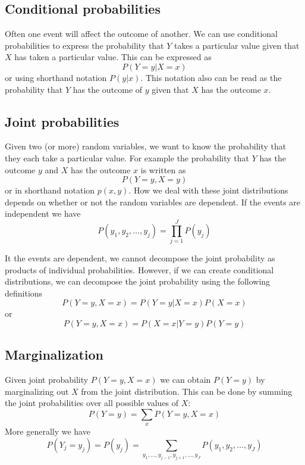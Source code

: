 \documentclass[a4paper,11pt]{article} %
\begin{document}
\subsection{Conditional probabilities}

Often one event will affect the outcome of another.
We can use conditional probabilities to express the probability that $Y$
takes a particular value given that $X$ has taken a particular value.
This can be expressed as
\begin{equation}
P(Y=y | X=x)
\end{equation}
or using shorthand notation $P(y|x)$.
This notation also can be read as the probability that $Y$ has the outcome of $y$ given
that $X$ has the outcome $x$.


\subsection{Joint probabilities}

Given two (or more) random variables, we want to know the probability that they each take a particular
value. For example the probability that $Y$ has the outcome $y$ and $X$ has the outcome $x$ is
written as
\begin{equation}
P(Y=y,X=y)
\end{equation}
or in shorthand notation $p(x,y)$. How we deal with these joint distributions depends on whether
or not the random variables are dependent. If the events are independent we have
\begin{equation}
P(y_1,y_2,\ldots,y_j) = \prod_{j=1}^{J} P(y_j)
\end{equation}

It the events are dependent, we cannot decompose the joint probability as products of
individual probabilities. However, if we can create conditional distributions, we can
decompose the joint probability using the following definitions
\begin{equation}
P(Y=y,X=x) = P(Y=y|X=x) P(X=x)
\end{equation}
or
\begin{equation}
P(Y=y,X=x) = P(X=x|Y=y) P(Y=y)
\end{equation}

\subsection{Marginalization}

Given joint probability $P(Y=y,X=x)$ we can obtain $P(Y=y)$ by marginalizing out $X$ from the
joint distribution. This can be done by summing the joint probabilities over all
possible values of $X$:
\begin{equation}
P(Y=y) = \sum_{x} P(Y=y,X=x)
\end{equation}
More generally we have
\begin{equation}
P(Y_j=y_j) = P(y_j) = \sum_{y_1,\ldots,y_{j-1},y_{j+1},\ldots,y_{J}}
P(y_1,y_2,\ldots,y_{J})
\end{equation}
\end{document}

